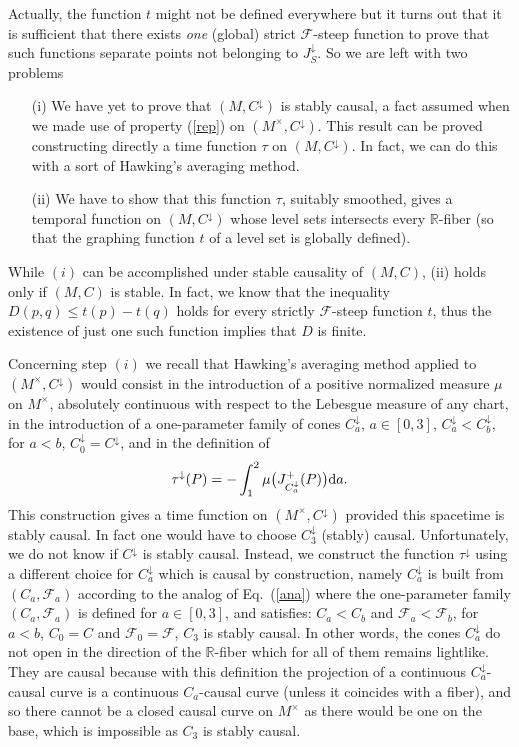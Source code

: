 \documentclass[a4paper]{jpconf}
\theoremstyle{definition}
\theoremstyle{remark}
\newcommand{\dd}{{\rm d}}
\begin{document}
Actually, the function $t$ might not be defined everywhere but it turns out that it is sufficient that there exists {\em one} (global) strict $\mathscr{F}$-steep function to prove that such functions separate points not belonging to $J_S^\downarrow$. So we are left with two problems
\begin{itemize}
\item[(i)] We have yet to prove that  $(M,C^\downarrow)$ is stably causal, a fact assumed when we made use of  property (\ref{rep}) on $(M^\times,C^\downarrow)$. This result can be proved constructing directly a time function $\tau$ on $(M,C^\downarrow)$. In fact, we can do this with a sort of Hawking's averaging method.
\item[(ii)] We have  to show that this function $\tau$, suitably smoothed, gives a temporal function on $(M,C^\downarrow)$ whose level sets intersects every $\mathbb{R}$-fiber (so that the graphing function $t$ of a level set  is globally defined).
\end{itemize}
While $(i)$ can be accomplished under stable causality of $(M,C)$, (ii) holds only if $(M,C)$ is stable. In fact, we know that the inequality
$D(p,q)\le t(p)-t(q)$ holds for every strictly $\mathscr{F}$-steep function $t$, thus the existence of just one such function implies that $D$ is finite.

Concerning step $(i)$ we recall that Hawking's averaging method \cite{hawking68,hawking73} applied to $(M^\times,C^\downarrow)$ would consist in the introduction of a positive normalized measure $\mu$ on $M^\times$, absolutely continuous with respect to the Lebesgue measure of any chart, in the introduction of a one-parameter family of cones $C^\downarrow_a{}$, $a\in [0,3]$, $C^\downarrow_a<C^\downarrow_b$, for $a<b$, $C^\downarrow_0=C^\downarrow$, and in the definition of
\[
\tau^\downarrow(P)=-\int_1^2 \mu\big(J_{C^\downarrow_a}^+(P)\big) \dd a .
\]
This construction gives a time function on $(M^\times,C^\downarrow)$ provided this spacetime is stably causal. In fact one would have to choose $C^\downarrow_3$ (stably) causal. Unfortunately, we do not know if $C^\downarrow$ is stably causal. Instead, we construct the function $\tau^\downarrow$ using a different choice for $C^\downarrow_a$ which is causal by construction, namely $C^\downarrow_a$ is built from $(C_a,\mathscr{F}_a)$ according to the analog of Eq.\ (\ref{ana}) where the one-parameter family $(C_a,\mathscr{F}_a)$ is defined for   $a\in [0,3]$, and satisfies: $C_a<C_b$ and $\mathscr{F}_a<\mathscr{F}_b$, for $a<b$, $C_0=C$ and $\mathscr{F}_0=\mathscr{F}$, $C_3$ is stably causal. In other words, the cones $C^\downarrow_a$ do not open in the direction of the $\mathbb{R}$-fiber which for all of them remains lightlike. They are causal because with this definition the projection of a continuous $C_a^\downarrow$-causal curve is a continuous $C_a$-causal curve (unless it coincides with a fiber), and so there cannot be a closed causal curve on $M^\times$ as there would be one on the base, which is impossible as $C_3$ is stably causal.
\end{document}
